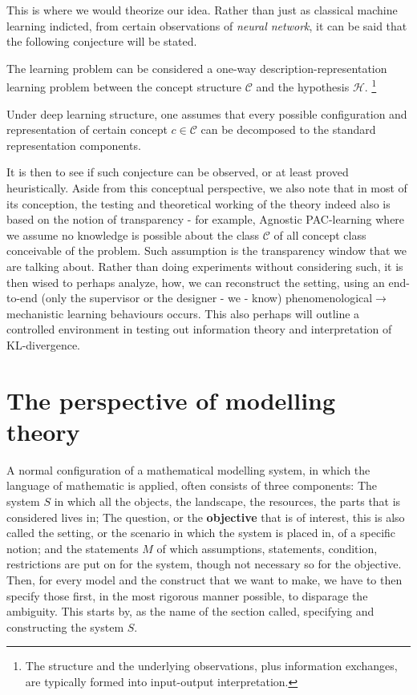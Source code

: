 This is where we would theorize our idea. Rather than just as classical machine learning indicted, from certain observations of \textit{neural network}, it can be said that the following conjecture will be stated. 

\begin{conjecture}
    The learning problem can be considered a one-way description-representation learning problem between the concept structure $\mathcal{C}$ and the hypothesis $\mathcal{H}$. \footnote{The structure and the underlying observations, plus information exchanges, are typically formed into input-output interpretation.}
\end{conjecture}
\begin{conjecture}
    Under deep learning structure, one assumes that every possible configuration and representation of certain concept $c\in \mathcal{C}$ can be decomposed to the standard representation components. 
\end{conjecture}
It is then to see if such conjecture can be observed, or at least proved heuristically. Aside from this conceptual perspective, we also note that in most of its conception, the testing and theoretical working of the theory indeed also is based on the notion of transparency - for example, Agnostic PAC-learning where we assume no knowledge is possible about the class $\mathcal{C}$ of all concept class conceivable of the problem. Such assumption is the transparency window that we are talking about. Rather than doing experiments without considering such, it is then wised to perhaps analyze, how, we can reconstruct the setting, using an end-to-end (only the supervisor or the designer - we - know) phenomenological$\to$ mechanistic learning behaviours occurs. This also perhaps will outline a controlled environment in testing out information theory and interpretation of KL-divergence. 

\section{The perspective of modelling theory}

A normal configuration of a mathematical modelling system, in which the language of mathematic is applied, often consists of three components: The system $S$ in which all the objects, the landscape, the resources, the parts that is considered lives in; The question, or the \textbf{objective} that is of interest, this is also called the setting, or the scenario in which the system is placed in, of a specific notion; and the statements $M$ of which assumptions, statements, condition, restrictions are put on for the system, though not necessary so for the objective. Then, for every model and the construct that we want to make, we have to then specify those first, in the most rigorous manner possible, to disparage the ambiguity. This starts by, as the name of the section called, specifying and constructing the system $S$. 

